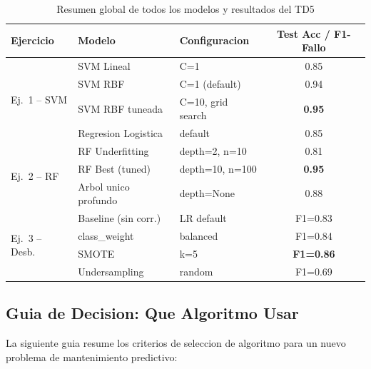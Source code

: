 \documentclass[12pt,a4paper]{article}
\begin{document}
\begin{table}[H]
  \centering
  \caption{Resumen global de todos los modelos y resultados del TD5}
  \label{tab:global_summary}
  \begin{tabular}{lllc}
    \toprule
    \textbf{Ejercicio} & \textbf{Modelo} & \textbf{Configuracion} & \textbf{Test Acc / F1-Fallo} \\
    \midrule
    \multirow{4}{*}{Ej.~1 -- SVM}
      & SVM Lineal           & C=1                  & 0.85 \\
      & SVM RBF              & C=1 (default)        & 0.94 \\
      & SVM RBF tuneada      & C=10, grid search    & \textbf{0.95} \\
      & Regresion Logistica  & default              & 0.85 \\
    \midrule
    \multirow{3}{*}{Ej.~2 -- RF}
      & RF Underfitting      & depth=2, n=10        & 0.81 \\
      & RF Best (tuned)      & depth=10, n=100      & \textbf{0.95} \\
      & Arbol unico profundo & depth=None           & 0.88 \\
    \midrule
    \multirow{4}{*}{Ej.~3 -- Desb.}
      & Baseline (sin corr.) & LR default           & F1=0.83 \\
      & class\_weight        & balanced             & F1=0.84 \\
      & SMOTE                & k=5                  & \textbf{F1=0.86} \\
      & Undersampling        & random               & F1=0.69 \\
    \bottomrule
  \end{tabular}
\end{table}

\subsection{Guia de Decision: Que Algoritmo Usar}

La siguiente guia resume los criterios de seleccion de algoritmo para un nuevo problema de
mantenimiento predictivo:
\end{document}
